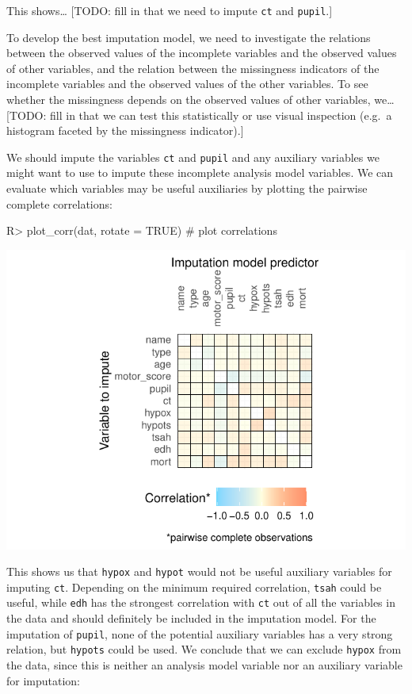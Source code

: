 \documentclass[
]{jss}
\begin{document}
This shows\ldots{} {[}TODO: fill in that we need to impute \texttt{ct}
and \texttt{pupil}.{]}

To develop the best imputation model, we need to investigate the
relations between the observed values of the incomplete variables and
the observed values of other variables, and the relation between the
missingness indicators of the incomplete variables and the observed
values of the other variables. To see whether the missingness depends on
the observed values of other variables, we\ldots{} {[}TODO: fill in that
we can test this statistically or use visual inspection (e.g.~a
histogram faceted by the missingness indicator).{]}

We should impute the variables \texttt{ct} and \texttt{pupil} and any
auxiliary variables we might want to use to impute these incomplete
analysis model variables. We can evaluate which variables may be useful
auxiliaries by plotting the pairwise complete correlations:

\begin{CodeChunk}
\begin{CodeInput}
R> plot_corr(dat, rotate = TRUE) # plot correlations 
\end{CodeInput}


\begin{center}\includegraphics{Imputation_of_Incomplete_Multilevel_Data_files/figure-latex/impact_corr-1} \end{center}

\end{CodeChunk}

This shows us that \texttt{hypox} and \texttt{hypot} would not be useful
auxiliary variables for imputing \texttt{ct}. Depending on the minimum
required correlation, \texttt{tsah} could be useful, while \texttt{edh}
has the strongest correlation with \texttt{ct} out of all the variables
in the data and should definitely be included in the imputation model.
For the imputation of \texttt{pupil}, none of the potential auxiliary
variables has a very strong relation, but \texttt{hypots} could be used.
We conclude that we can exclude \texttt{hypox} from the data, since this
is neither an analysis model variable nor an auxiliary variable for
imputation:
\end{document}
